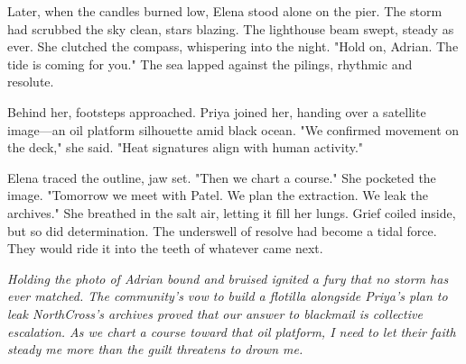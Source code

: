 Later, when the candles burned low, Elena stood alone on the pier. The storm had scrubbed the sky clean, stars blazing. The lighthouse beam swept, steady as ever. She clutched the compass, whispering into the night. "Hold on, Adrian. The tide is coming for you." The sea lapped against the pilings, rhythmic and resolute.

Behind her, footsteps approached. Priya joined her, handing over a satellite image—an oil platform silhouette amid black ocean. "We confirmed movement on the deck," she said. "Heat signatures align with human activity."

Elena traced the outline, jaw set. "Then we chart a course." She pocketed the image. "Tomorrow we meet with Patel. We plan the extraction. We leak the archives." She breathed in the salt air, letting it fill her lungs. Grief coiled inside, but so did determination. The underswell of resolve had become a tidal force. They would ride it into the teeth of whatever came next.


\noindent\textit{Holding the photo of Adrian bound and bruised ignited a fury that no storm has ever matched. The community's vow to build a flotilla alongside Priya's plan to leak NorthCross's archives proved that our answer to blackmail is collective escalation. As we chart a course toward that oil platform, I need to let their faith steady me more than the guilt threatens to drown me.}
